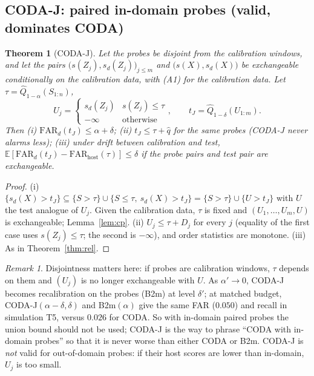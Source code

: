 \documentclass[conference]{IEEEtran}
\newtheorem{theorem}{Theorem}
\theoremstyle{definition}
\theoremstyle{remark}
\newtheorem{remark}{Remark}
\newcommand{\Q}{\widehat Q}
\newcommand{\E}{\mathbb E}
\newcommand{\FAR}{\mathrm{FAR}}
\begin{document}
\subsection{CODA-J: paired in-domain probes (valid, dominates CODA)}
\begin{theorem}[CODA-J]\label{thm:joint}
Let the probes be disjoint from the calibration windows, and let the pairs $\bigl(s(Z_j),s_d(Z_j)\bigr)_{j\le m}$ and $\bigl(s(X),s_d(X)\bigr)$ be exchangeable conditionally on the calibration data, with (A1) for the calibration data. Let $\tau=\Q_{1-\alpha}(S_{1:n})$,
\[U_j=\begin{cases}s_d(Z_j)&s(Z_j)\le\tau\\-\infty&\text{otherwise}\end{cases},\qquad t_J=\Q_{1-\delta}(U_{1:m}).\]
Then (i) $\FAR_d(t_J)\le\alpha+\delta$; (ii) $t_J\le\tau+\hat q$ for the same probes (CODA-J never alarms less); (iii) under drift between calibration and test, $\E[\FAR_d(t_J)-\FAR_{\mathrm{host}}(\tau)]\le\delta$ if the probe pairs and test pair are exchangeable.
\end{theorem}
\begin{proof}
(i) $\{s_d(X)>t_J\}\subseteq\{S>\tau\}\cup\{S\le\tau,\ s_d(X)>t_J\}=\{S>\tau\}\cup\{U>t_J\}$ with $U$ the test analogue of $U_j$. Given the calibration data, $\tau$ is fixed and $(U_1,\dots,U_m,U)$ is exchangeable; Lemma~\ref{lem:cp}. (ii) $U_j\le\tau+D_j$ for every $j$ (equality of the first case uses $s(Z_j)\le\tau$; the second is $-\infty$), and order statistics are monotone. (iii) As in Theorem~\ref{thm:rel}.
\end{proof}
\begin{remark}
Disjointness matters here: if probes are calibration windows, $\tau$ depends on them and $(U_j)$ is no longer exchangeable with $U$. As $\alpha'\to0$, CODA-J becomes recalibration on the probes (B2m) at level $\delta'$; at matched budget, CODA-J$(\alpha-\delta,\delta)$ and B2m$(\alpha)$ give the same FAR ($0.050$) and recall in simulation T5, versus $0.026$ for CODA. So with in-domain paired probes the union bound should not be used; CODA-J is the way to phrase ``CODA with in-domain probes'' so that it is never worse than either CODA or B2m. CODA-J is \emph{not} valid for out-of-domain probes: if their host scores are lower than in-domain, $U_j$ is too small.
\end{remark}
\end{document}
